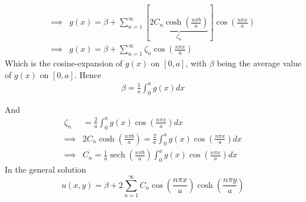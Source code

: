 \documentclass[12pt]{article}
\begin{document}
{\begin{align*}
\implies& g(x) = \beta + \sum_{n=1}^{\infty} \left[ \underbrace{ 2C_n \cosh \left( \frac{n \pi b}{a} \right) }_{\zeta_n} \right] \cos \left( \frac{n \pi x}{a} \right) \\
\implies& g(x) = \beta + \sum_{n=1}^{\infty} \zeta_n \cos \left( \frac{n \pi x}{a} \right)
\end{align*}
Which is the cosine-expansion of $g(x)$ on $[0,a]$, with $\beta$ being the average value of $g(x)$ on $[0,a]$. Hence
\begin{align*}
\boxed{\beta = \frac{1}{a} \int_0^a g(x) dx} \\ \\
\end{align*}
And
\begin{align*}
\zeta_n &= \frac{2}{a} \int_0^a g(x) \cos \left( \frac{n \pi x}{a} \right) dx \\
\implies& 2C_n \cosh \left( \frac{n \pi b}{a} \right) = \frac{2}{a} \int_0^a g(x) \cos \left( \frac{n \pi x}{a} \right) dx \\
\implies& \boxed{C_n = \frac{1}{a} \operatorname{sech} \left( \frac{n \pi b}{a} \right) \int_0^a g(x) \cos \left( \frac{n \pi x}{a} \right) dx }
\end{align*}
In the general solution
$$\boxed{u(x,y) =  \beta + 2 \sum_{n=1}^{\infty} C_n \cos \left( \frac{n \pi x}{a} \right) \cosh \left( \frac{n \pi y}{a} \right)}$$
}
\vspace{0.3in}
\end{document}
